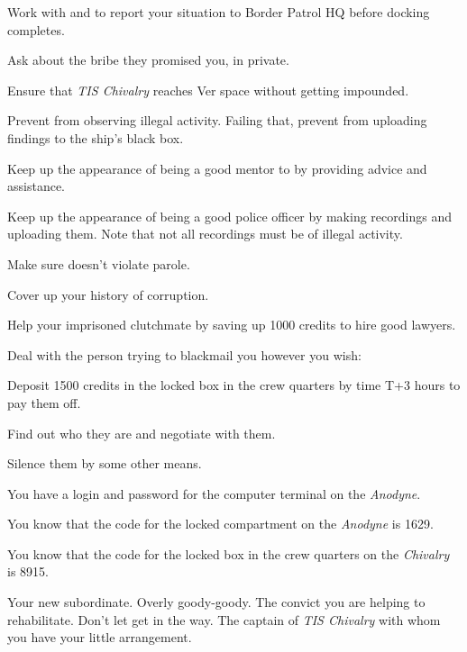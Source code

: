 \documentclass[char]{guildcamp4}
\begin{document}
\begin{itemz}[Goals]
	\item Work with \cCgood{} and \cPilot{} to report your situation to Border Patrol HQ before docking completes.
	\item Ask \cVone{} about the bribe they promised you, in private.
	\item Ensure that \emph{TIS Chivalry} reaches Ver space without getting impounded.
	\item Prevent \cCgood{} from observing illegal activity. Failing that, prevent \cCgood{\them} from uploading \cCgood{\their} findings to the ship's black box.
	\item Keep up the appearance of being a good mentor to \cCgood{} by providing advice and assistance.
	\item Keep up the appearance of being a good police officer by making recordings and uploading them. Note that not all recordings must be of illegal activity.
	\item Make sure \cPilot{} doesn't violate \cPilot{\their} parole. 
	\item Cover up your history of corruption.
	\item Help your imprisoned clutchmate by saving up 1000 credits to hire good lawyers.
	\item Deal with the person trying to blackmail you however you wish:
		\begin{itemz}
		\item Deposit 1500 credits in the locked box in the crew quarters by time T+3 hours to pay them off.
		\item Find out who they are and negotiate with them.
		\item Silence them by some other means.
		\end{itemz}
\end{itemz}

\begin{itemz}[Notes]
	\item You have a login and password for the computer terminal on the \emph{Anodyne}.
	\item You know that the code for the locked compartment on the \emph{Anodyne} is 1629.
	\item You know that the code for the locked box in the crew quarters on the \emph{Chivalry} is 8915.
\end{itemz}

\begin{contacts}
	\contact{\cCgood{}} Your new subordinate. Overly goody-goody.
	\contact{\cPilot{}} The convict you are helping to rehabilitate. Don't let \cPilot{\them} get in the way.
	\contact{\cVone{}} The captain of \emph{TIS Chivalry} with whom you have your little arrangement.
\end{contacts}
\end{document}
